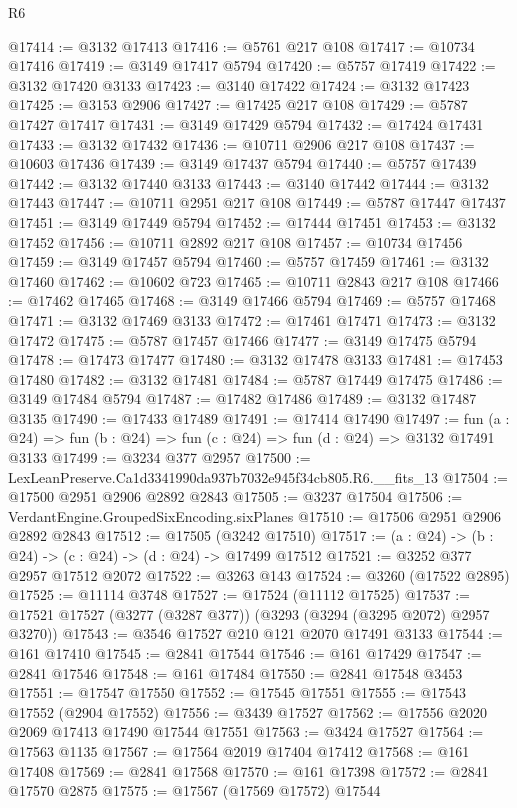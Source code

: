 \begin{lexlean}{R6}
\begin{coremodule}
@17414 := @3132 @17413
@17416 := @5761 @217 @108
@17417 := @10734 @17416
@17419 := @3149 @17417 @5794
@17420 := @5757 @17419
@17422 := @3132 @17420 @3133
@17423 := @3140 @17422
@17424 := @3132 @17423
@17425 := @3153 @2906
@17427 := @17425 @217 @108
@17429 := @5787 @17427 @17417
@17431 := @3149 @17429 @5794
@17432 := @17424 @17431
@17433 := @3132 @17432
@17436 := @10711 @2906 @217 @108
@17437 := @10603 @17436
@17439 := @3149 @17437 @5794
@17440 := @5757 @17439
@17442 := @3132 @17440 @3133
@17443 := @3140 @17442
@17444 := @3132 @17443
@17447 := @10711 @2951 @217 @108
@17449 := @5787 @17447 @17437
@17451 := @3149 @17449 @5794
@17452 := @17444 @17451
@17453 := @3132 @17452
@17456 := @10711 @2892 @217 @108
@17457 := @10734 @17456
@17459 := @3149 @17457 @5794
@17460 := @5757 @17459
@17461 := @3132 @17460
@17462 := @10602 @723
@17465 := @10711 @2843 @217 @108
@17466 := @17462 @17465
@17468 := @3149 @17466 @5794
@17469 := @5757 @17468
@17471 := @3132 @17469 @3133
@17472 := @17461 @17471
@17473 := @3132 @17472
@17475 := @5787 @17457 @17466
@17477 := @3149 @17475 @5794
@17478 := @17473 @17477
@17480 := @3132 @17478 @3133
@17481 := @17453 @17480
@17482 := @3132 @17481
@17484 := @5787 @17449 @17475
@17486 := @3149 @17484 @5794
@17487 := @17482 @17486
@17489 := @3132 @17487 @3135
@17490 := @17433 @17489
@17491 := @17414 @17490
@17497 := fun (a : @24) => fun (b : @24) => fun (c : @24) => fun (d : @24) => @3132 @17491 @3133
@17499 := @3234 @377 @2957
@17500 := LexLeanPreserve.Ca1d3341990da937b7032e945f34cb805.R6.__fits_13
@17504 := @17500 @2951 @2906 @2892 @2843
@17505 := @3237 @17504
@17506 := VerdantEngine.GroupedSixEncoding.sixPlanes
@17510 := @17506 @2951 @2906 @2892 @2843
@17512 := @17505 (@3242 @17510)
@17517 := (a : @24) -> (b : @24) -> (c : @24) -> (d : @24) -> @17499 @17512
@17521 := @3252 @377 @2957 @17512 @2072
@17522 := @3263 @143
@17524 := @3260 (@17522 @2895)
@17525 := @11114 @3748
@17527 := @17524 (@11112 @17525)
@17537 := @17521 @17527 (@3277 (@3287 @377)) (@3293 (@3294 (@3295 @2072) @2957 @3270))
@17543 := @3546 @17527 @210 @121 @2070 @17491 @3133
@17544 := @161 @17410
@17545 := @2841 @17544
@17546 := @161 @17429
@17547 := @2841 @17546
@17548 := @161 @17484
@17550 := @2841 @17548 @3453
@17551 := @17547 @17550
@17552 := @17545 @17551
@17555 := @17543 @17552 (@2904 @17552)
@17556 := @3439 @17527
@17562 := @17556 @2020 @2069 @17413 @17490 @17544 @17551
@17563 := @3424 @17527
@17564 := @17563 @1135
@17567 := @17564 @2019 @17404 @17412
@17568 := @161 @17408
@17569 := @2841 @17568
@17570 := @161 @17398
@17572 := @2841 @17570 @2875
@17575 := @17567 (@17569 @17572) @17544

\end{coremodule}
\end{lexlean}
